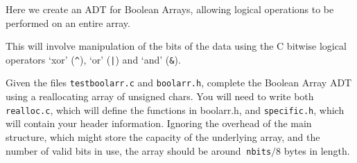 
Here we create an ADT for Boolean Arrays, allowing logical operations to be performed on an entire array.

\noindent
This will involve manipulation of the bits of the data
using the C bitwise logical operators `xor' (\verb#^#), `or' (\verb^|^) and `and' (\verb^&^).

\begin{exercise}
Given the files \verb^testboolarr.c^ and \verb^boolarr.h^, complete the Boolean Array ADT using
a reallocating array of unsigned chars. You will need to write both \verb^realloc.c^, which will define the 
functions in boolarr.h, and \verb^specific.h^, which will contain your header information. 
Ignoring the overhead of the main structure, 
which might store the capacity of the underlying array, and the number of valid bits in use, 
the array should be around $~$\verb^nbits^$/8$ bytes in length.
\end{exercise}
